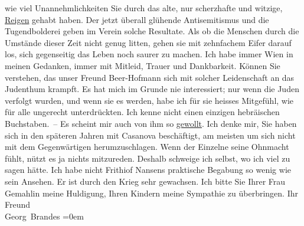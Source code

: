 \begin{ledgroupsized}[t]{13cm}
               wie viel Unannehmlichkeiten Sie durch das alte, nur scherzhafte und witzige, \uline{Reigen} gehabt haben. Der jetzt überall glühende Antisemitismus und die Tugendbolderei
                  \introOben{}geben\introOben{} im Verein 
               solche Resultate. Als ob die Menschen durch die Umstände dieser Zeit nicht genug
               litten, gehen sie mit zehnfachem Eifer darauf los, sich gegenseitig das Leben noch
               saurer zu machen.\pend
           \pstart
           Ich habe immer Wien in meinen Gedanken, immer mit
               Mitleid, Trauer und Dankbarkeit. Können Sie verstehen, das unser Freund Beer-Hofmann sich {\pb}mit solcher Leidenschaft an das
               Judenthum krampft. Es hat mich im Grunde nie interessiert; nur wenn die Juden
               verfolgt wurden, und wenn sie es werden, habe ich für sie heisses Mitgefühl, wie für
               alle ungerecht unterdrückten. Ich kenne nicht einen einzigen hebräischen
               Buchstaben. – Es scheint mir auch von ihm so \uline{gewollt}.\pend
           \pstart
           Ich denke mir, Sie haben sich in den späteren Jahren mit Casanova beschäftigt, am meisten um sich nicht mit dem
               Gegenwärtigen herumzuschlagen. Wenn der Einzelne seine Ohnmacht fühlt, nützt es ja
               nichts mitzureden. Deshalb schweige ich selbst, wo ich viel zu sagen hätte. Ich habe
               nicht Frithiof Nansens praktische Begabung so
               wenig wie sein Ansehen. Er ist durch den Krieg sehr gewachsen.\pend
           \pstart
           Ich bitte Sie Ihrer Frau Gemahlin meine Huldigung, Ihren Kindern meine Sympathie zu überbringen.\pend
           \pstart
           Ihr Freund{\\[\baselineskip]}\spacefill\mbox{Georg Brandes}\pend
           \leftskip=0em{}
         
         \endnumbering{}\end{ledgroupsized}  \newcommand{\dateiname}{L02373}\newcommand{\titel}{Georg Brandes an Arthur Schnitzler, 5. 1. 1922}\newcommand{\editorInnen}{Martin Anton Müller und Gerd-Hermann Susen}
      